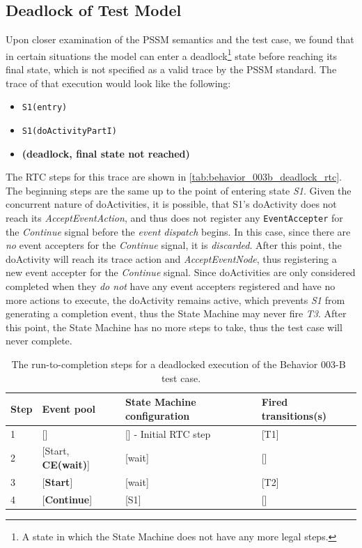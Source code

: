 \subsection{Deadlock of Test Model}\label{ssec:deadlock}

Upon closer examination of the PSSM semantics and the test case, we found that in certain situations the model can enter a deadlock\footnote{A state in which the State Machine does not have any more legal steps.} state before reaching its final state, which is not specified as a valid trace by the PSSM standard. The trace of that execution would look like the following:

\begin{itemize}
    \item \verb|S1(entry)|
    \item \verb|S1(doActivityPartI)|
    \item \textbf{(deadlock, final state not reached)}
\end{itemize}

The RTC steps for this trace are shown in \autoref{tab:behavior_003b_deadlock_rtc}. The beginning steps are the same up to the point of entering state \emph{S1}. Given the concurrent nature of doActivities, it is possible, that S1's doActivity does not reach its \emph{AcceptEventAction}, and thus does not register any \verb|EventAccepter| for the \emph{Continue} signal before the \emph{event dispatch} begins. In this case, since there are \textit{no} event accepters for the \textit{Continue} signal, it is \emph{discarded}. After this point, the doActivity will reach its trace action and \textit{AcceptEventNode}, thus registering a new event accepter for the \textit{Continue} signal. Since doActivities are only considered completed when they \emph{do not} have any event accepters registered and have no more actions to execute, the doActivity remains active, which prevents \textit{S1} from generating a completion event, thus the State Machine may never fire \textit{T3}. After this point, the State Machine has no more steps to take, thus the test case will never complete.

\begin{table}[htbp]
\centering
\begin{tabular}{|l||l|l|l|}
\hline
\textbf{Step} & \textbf{Event pool} & \textbf{State Machine configuration} & \textbf{Fired transitions(s)} \\ \hline\hline
1    & {[}{]}              & {[}{]} - Initial RTC step   & {[}T1{]}             \\ \hline
2    & {[}Start, \textbf{CE(wait)}{]} & {[}wait{]}                    & {[}{]}               \\ \hline
3    & {[}\textbf{Start}{]}         & {[}wait{]}                    & {[}T2{]}             \\ \hline
4    & {[}\textbf{Continue}{]}         & {[}S1{]}                    & {[}{]}             \\ \hline
\end{tabular}
\caption{The run-to-completion steps for a deadlocked execution of the Behavior 003-B~\cite{pssm} test case.}
\label{tab:behavior_003b_deadlock_rtc}
\end{table}

